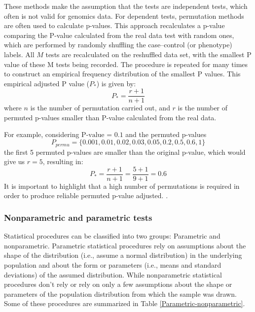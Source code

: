 These methods make the assumption that
the tests are independent tests, which often is not valid for genomics data.
For dependent tests, permutation methods are often used to calculate
 p-values.  This approach recalculates a p-value comparing
 the P-value calculated
 from the real data test with random ones,
 which are performed by randomly shuffling the case–control (or phenotype)
 labels. All $M$ tests are recalculated on the reshuffled data set, with the smallest P value of these M tests being recorded. The procedure is repeated for many times to construct an empirical frequency distribution of the smallest P values.
This  empirical adjusted P value ($P_{*}$) is given by: $$P_{*} = \frac{r + 1}{n + 1}$$ where $n$ is the number of
permutation carried out, and $r$ is the number of permuted p-values smaller than P-value calculated
from the real data.

For example, considering $\textrm{P-value = 0.1}$ and the
permuted p-values $$P_{permu} =\{0.001,0.01,0.02,0.03,0.05,0.2,0.5,0.6,1\}$$ the first 5 permuted p-values
are smaller than the original p-value, which would give us $r = 5$, resulting in:
$$P_{*} = \frac{r + 1}{n + 1} =  \frac{5 + 1}{9 + 1} = 0.6 $$
It is important to highlight that
a high number of permutations is required in order to produce reliable permuted p-value adjusted.
 \cite{davison1997bootstrap,north2002note,north2003note,sham2014statistical}.


\subsubsection{Nonparametric and parametric tests}

Statistical procedures can be classified into two groups:  Parametric and nonparametric.
Parametric statistical procedures rely on assumptions about the shape of the distribution
(i.e., assume a normal distribution) in the underlying population and about the form or
parameters (i.e., means and standard deviations) of the assumed distribution.
While nonparametric statistical procedures don't rely or rely on only a few assumptions about the shape or
parameters of the population distribution from which the sample was drawn.
Some of these procedures are summarized in Table \ref{Parametric-nonparametric}.

